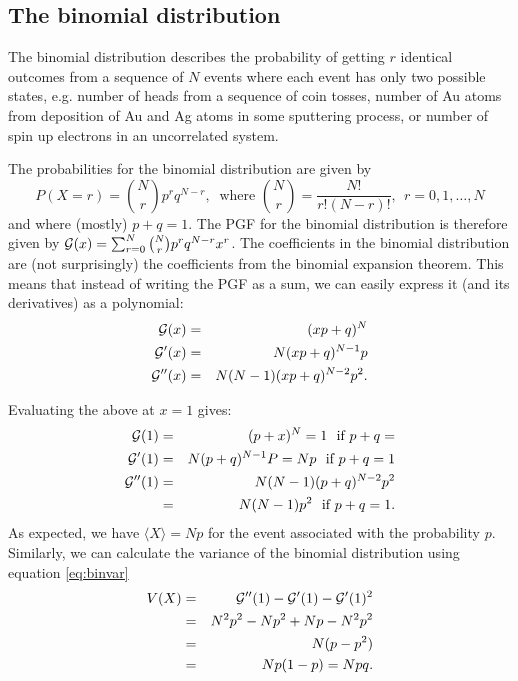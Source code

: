 
\subsection{The binomial distribution}
The binomial distribution describes the probability of getting $r$ identical outcomes from a sequence of $N$ events where each event has only two possible states, e.g. number of heads from a sequence of coin tosses, number of Au atoms from deposition of Au and Ag atoms in some sputtering process, or number of spin up electrons in an uncorrelated system.

The probabilities for the binomial distribution are given by
$$P(X=r) = \binom{N}{r}p^rq^{N-r}, ~\text{ where } \binom{N}{r} = \frac{N!}{r!(N-r)!}, ~~r=0,1,\ldots,N$$
and where (mostly) $p+q=1$.
The PGF for the binomial distribution is therefore given by $\mathcal{G}(x) = \sum_{r=0}^N\binom{N}{r}p^rq^{N-r}x^r$. 
The coefficients in the binomial distribution are (not surprisingly) the coefficients from the  binomial expansion theorem. This means that instead of writing the PGF as a sum, we can easily express it (and its derivatives) as a polynomial:
\begin{eqnarray*}
	\mathcal{G}(x)  &=& (xp +q)^N \\
	\mathcal{G}'(x) &=& N(xp+q)^{N-1}p\\
	\mathcal{G}''(x) &=& N(N-1)(xp+q)^{N-2}p^2. 
\end{eqnarray*}

Evaluating the above at $x=1$ gives:
	\begin{eqnarray*}
	\mathcal{G}(1) &=& (p+x)^N = 1 ~\text{ if } p+q=\\
	\mathcal{G}'(1) &=& N(p+q)^{N-1}P = Np  ~\text{ if } p+q=1\\
	\mathcal{G}''(1) &=& N(N-1)(p+q)^{N-2}p^2 \\
		&=&N(N-1)p^2  ~\text{ if } p+q=1.
\end{eqnarray*}
As expected, we have $\langle X\rangle =Np$ for the event associated with the probability $p$.
Similarly, we can calculate the variance of the binomial distribution using equation \ref{eq:binvar}
\begin{eqnarray*}
	V(X) &=&\mathcal{G}''(1) - \mathcal{G}'(1) -\mathcal{G}'(1)^2\\
		&=& N^2p^2-Np^2+Np-N^2p^2\\
		&=& N(p-p^2)\\
		&=& Np(1-p)= Npq.
\end{eqnarray*}

